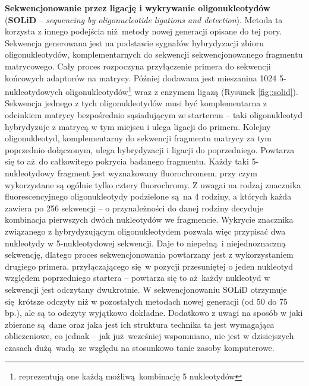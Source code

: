 \documentclass[two column, twoside, a4paper]{article}
\begin{document}
\textbf{Sekwencjonowanie przez ligację i wykrywanie oligonukleotydów} (\textbf{SOLiD} -- \textit{sequencing by oligonucleotide ligations and detection}). Metoda ta korzysta z innego podejścia niż metody nowej generacji opisane do tej pory. Sekwencja generowana jest na podstawie sygnałów hybrydyzacji zbioru oligonukleotydów, komplementarnych do sekwencji sekwencjonowanego fragmentu matrycowego. Cały proces rozpoczyna przyłączenie primera do sekwencji końcowych adaptorów na matrycy. Później dodawana jest mieszanina 1024 5-nukleotydowych oligonukleotydów\footnote{reprezentują one każdą możliwą kombinację 5 nukleotydów} wraz z enzymem ligazą (Rysunek \ref{fig::solid}). Sekwencja jednego z tych oligonukleotydów musi być komplementarna z odcinkiem matrycy bezpośrednio sąsiadującym ze starterem -- taki oligonukleotyd hybrydyzuje z matrycą w tym miejscu i ulega ligacji do primera. Kolejny oligonukleotyd, komplementarny do sekwencji fragmentu matrycy za tym poprzednio dołączonym, ulega hybrydyzacji i ligacji do poprzedniego. Powtarza się to aż do całkowitego pokrycia badanego fragmentu. Każdy taki 5-nukleotydowy fragment jest wyznakowany fluorochromem, przy czym wykorzystane są ogólnie tylko cztery fluorochromy. Z uwagai na rodzaj znacznika fluorescencyjnego oligonukleotydy podzielone są na 4 rodziny, a których każda zawiera po 256 sekwencji -- o przynależności do danej rodziny decyduje kombinacja pierwszych dwóch nukleotydów we fragmencie. Wykrycie znacznika związanego z hybrydyzującym oligonukleotydem pozwala więc przypisać dwa nukleotydy w 5-nukleotydowej sekwencji. Daje to niepełną i niejednoznaczną sekwencję, dlatego proces sekwencjonowania powtarzany jest z wykorzystaniem drugiego primera, przyłączającego się w pozycji przesuniętej o jeden nukleotyd względem poprzedniego startera -- powtarza się to aż każdy nukleotyd w sekwencji jest odczytany dwukrotnie. W sekwencjonowaniu SOLiD otrzymuje się krótsze odczyty niż w pozostałych metodach nowej generacji (od 50 do 75 bp.), ale są to odczyty wyjątkowo dokładne. Dodatkowo z uwagi na sposób w jaki zbierane są dane oraz jaka jest ich struktura technika ta jest wymagająca obliczeniowe, co jednak -- jak już wcześniej wspomniano, nie jest w dzisiejszych czasach dużą wadą ze względu na stosunkowo tanie zasoby komputerowe. \autocite{Godwin2016} \autocite{Brown2019}
\end{document}
